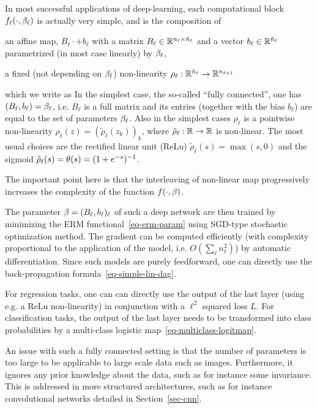In most successful applications of deep-learning, each computational block $f_{\ell}(\cdot,\beta_\ell)$ is actually very simple, and is the composition of 
\begin{rs}
	\item an affine map, $B_\ell \cdot + b_\ell$ with a matrix $B_\ell \in \mathbb{R}^{n_\ell \times \tilde n_{\ell}}$ and a vector $b_\ell \in \mathbb{R}^{\tilde n_\ell}$ parametrized (in most case linearly) by $\beta_\ell$, 
	\item a fixed (not depending on $\beta_\ell$) non-linearity $\rho_\ell : \mathbb{R}^{\tilde n_{\ell}} \rightarrow \mathbb{R}^{n_{\ell+1}}$
\end{rs}
which we write as
In the simplest case, the so-called ``fully connected'', one has $(B_\ell,b_\ell)=\beta_\ell$, i.e. $B_\ell$ is a full matrix and its entries (together with the bias $b_\ell$) are equal to the set of parameters $\beta_\ell$. 
%
Also in the simplest cases $\rho_\ell$ is a pointwise non-linearity $\rho_\ell(z)=(\tilde\rho_\ell(z_k))_k$, where $\tilde\rho_\ell : \mathbb{R} \rightarrow \mathbb{R}$ is non-linear. The most usual choices are the rectified linear unit (ReLu) $\tilde\rho_\ell(s)=\max(s,0)$ and the sigmoid $\tilde\rho_\ell(s)=\theta(s) = (1+e^{-s})^{-1}$.

The important point here is that the interleaving of non-linear map progressively increases the complexity of the function $f(\cdot,\beta)$.

The parameter $\beta = (B_\ell,b_\ell)_\ell$ of such a deep network are then trained by minimizing the ERM functional~\eqref{eq-erm-param} using SGD-type stochastic optimization method. The gradient can be computed efficiently (with complexity proportional to the application of the model, i.e. $O(\sum_\ell n_\ell^2)$) by automatic differentiation. Since such models are purely feedforward, one can directly use the back-propagation formula~\eqref{eq-simple-lin-dag}.

For regression tasks, one can can directly use the output of the last layer (using e.g. a ReLu non-linearity) in conjunction with a $\ell^2$ squared loss $L$.
%
For classification tasks, the output of the last layer needs to be transformed into class probabilities by a multi-class logistic map~\eqref{eq-multiclass-logitmap}.

An issue with such a fully connected setting is that the number of parameters is too large to be applicable to large scale data such as images. Furthermore, it ignores any prior knowledge about the data, such as for instance some invariance. This is addressed in more structured architectures, such as for instance convolutional networks detailed in Section~\ref{sec-cnn}. 


